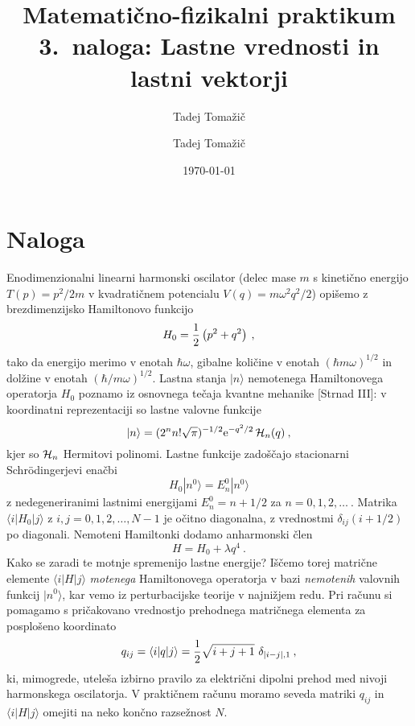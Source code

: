 \documentclass[slovene,11pt,a4paper]{article}
\title{
Matematično-fizikalni praktikum\\
\bigskip
\bf\Large 3.~naloga: Lastne vrednosti in lastni vektorji
}
\author{Tadej Tomažič}
\begin{document}
\author{Tadej Tomažič}
\date{\today}

\maketitle

\newpage
{}
\tableofcontents
\listoffigures
\newpage


\section{Naloga}
Enodimenzionalni linearni harmonski oscilator (delec mase $m$
s kinetično energijo $T(p)=p^2/2m$ v kvadratičnem potencialu
$V(q)=m\omega^2 q^2/2$) opišemo z brezdimenzijsko Hamiltonovo funkcijo
\begin{equation*}
  H_0 = {1\over 2} \left( p^2 + q^2 \right) \>,
\end{equation*}
tako da energijo merimo v enotah $\hbar\omega$, gibalne količine
v enotah $(\hbar m\omega)^{1/2}$ in dolžine v enotah $(\hbar/m\omega)^{1/2}$.
Lastna stanja $|n\rangle$ nemotenega Hamiltonovega operatorja $H_0$
poznamo iz osnovnega tečaja kvantne mehanike [Strnad III]:
v koordinatni reprezentaciji so lastne valovne funkcije
\begin{equation*}
  |n\rangle = (2^n n! \sqrt{\pi})^{-1/2} \mathrm{e}^{-q^2/2}\,  {\cal H}_n (q)\>,
\end{equation*}
kjer so ${\cal H}_n$ Hermitovi polinomi.
Lastne funkcije zadoščajo stacionarni Schr\"odingerjevi enačbi
\begin{equation*}
H_0 | n^0 \rangle = E_n^0 | n^0 \rangle
\end{equation*}
z nedegeneriranimi lastnimi energijami $E_n^0 = n + 1/2$
za $n=0,1,2,\ldots~$.  Matrika $\langle i | H_0 | j\rangle$
z $i,j=0,1,2,\ldots,N-1$ je očitno diagonalna, z vrednostmi
$\delta_{ij}(i + 1/2)$ po diagonali.  Nemoteni Hamiltonki
dodamo anharmonski člen
\begin{equation*}
H = H_0 + \lambda q^4 \>.
\end{equation*}
Kako se zaradi te motnje spremenijo lastne energije?
Iščemo torej matrične elemente $\langle i | H | j\rangle$
{\sl motenega\/} Hamiltonovega operatorja v bazi {\sl nemotenih\/}
valovnih funkcij $| n^0\rangle$, kar vemo iz perturbacijske
teorije v najnižjem redu.  Pri računu si pomagamo
s pričakovano vrednostjo prehodnega matričnega
elementa za posplošeno koordinato
$$
q_{ij} = \langle i | q | j \rangle
       = {1\over 2} \sqrt{i+j+1}\,\, \delta_{|i-j|,1} \>,
$$
ki, mimogrede, uteleša izbirno pravilo za električni dipolni
prehod med nivoji harmonskega oscilatorja.  V praktičnem računu
moramo seveda matriki $q_{ij}$ in $\langle i | H | j\rangle$
omejiti na neko končno razsežnost $N$.
\end{document}
